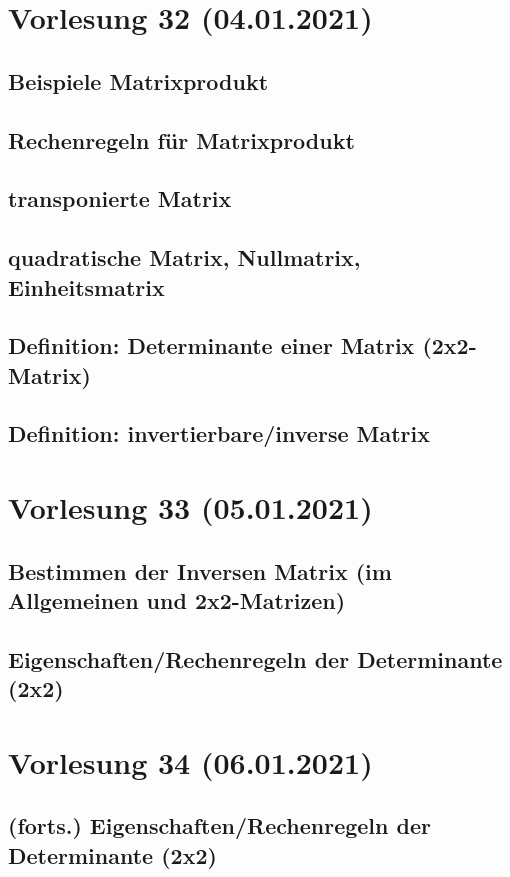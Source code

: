 \documentclass[]{article}
\begin{document}
\section{Vorlesung 32 (04.01.2021)}
\subsection{Beispiele Matrixprodukt}
\subsection{Rechenregeln für Matrixprodukt}
\subsection{transponierte Matrix}
\subsection{quadratische Matrix, Nullmatrix, Einheitsmatrix}
\subsection{Definition: Determinante einer Matrix (2x2-Matrix)}
\subsection{Definition: invertierbare/inverse Matrix}


\section{Vorlesung 33 (05.01.2021)}
\subsection{Bestimmen der Inversen Matrix (im Allgemeinen und 2x2-Matrizen)}
\subsection{Eigenschaften/Rechenregeln der Determinante (2x2)}


\section{Vorlesung 34 (06.01.2021)}
\subsection{(forts.) Eigenschaften/Rechenregeln der Determinante (2x2)}
\end{document}
